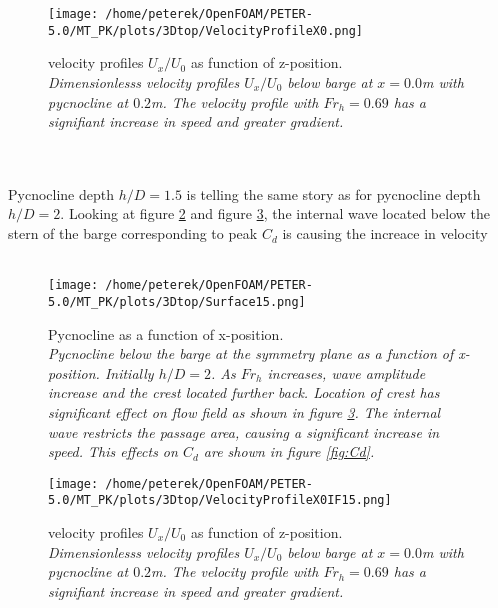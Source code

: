 \documentclass[a4paper, 12pt]{report}
\begin{document}
\vspace{2ex}
\begin{minipage}[t]{.45\textwidth}
	\begin{figure}[H]
		\centering
		\texttt{[image: /home/peterek/OpenFOAM/PETER-5.0/MT\_PK/plots/3Dtop/VelocityProfileX0.png]}
		\caption{velocity profiles $U_x/U_0$ as function of z-position. \\ \textit{Dimensionlesss velocity profiles $U_x/U_0$ below barge at $x = 0.0$m with pycnocline at $0.2$m. The velocity profile with $Fr_h = 0.69$ has a signifiant increase in speed and greater gradient.}}
		\label{fig:velocityProfileX0}
	\end{figure}
\end{minipage}\hfill
\vspace{2ex}\\
\\
Pycnocline depth $h/D=1.5$ is telling the same story as for pycnocline depth $h/D=2$. Looking at figure \ref{fig:eta2} and figure \ref{fig:velocityProfileX0If15}, the internal wave located below the stern of the barge corresponding to peak $C_d$ is causing the increace in velocity\\
\\
\begin{minipage}[t]{.45\textwidth} 
	\begin{figure}[H]
		\centering
		\texttt{[image: /home/peterek/OpenFOAM/PETER-5.0/MT\_PK/plots/3Dtop/Surface15.png]}
		\caption{Pycnocline as a function of x-position. \\ \textit{Pycnocline below the barge at the symmetry plane as a function of x-position. Initially $h/D=2$. As $Fr_h$ increases, wave amplitude increase and the crest located further back. Location of crest has significant effect on flow field as shown in figure \ref{fig:velocityProfileX0If15}. The internal wave restricts the passage area, causing a significant increase in speed. This effects on $C_d$ are shown in figure \ref{fig:Cd}.}}
		\label{fig:eta2}
	\end{figure}
\end{minipage}\hfill
\vspace{2ex}
\begin{minipage}[t]{.45\textwidth}
	\begin{figure}[H]
		\centering
		\texttt{[image: /home/peterek/OpenFOAM/PETER-5.0/MT\_PK/plots/3Dtop/VelocityProfileX0IF15.png]}
		\caption{velocity profiles $U_x/U_0$ as function of z-position. \\ \textit{Dimensionlesss velocity profiles $U_x/U_0$ below barge at $x = 0.0$m with pycnocline at $0.2$m. The velocity profile with $Fr_h = 0.69$ has a signifiant increase in speed and greater gradient.}}
		\label{fig:velocityProfileX0If15}
	\end{figure}
\end{minipage}\hfill
\vspace{2ex}
\end{document}
